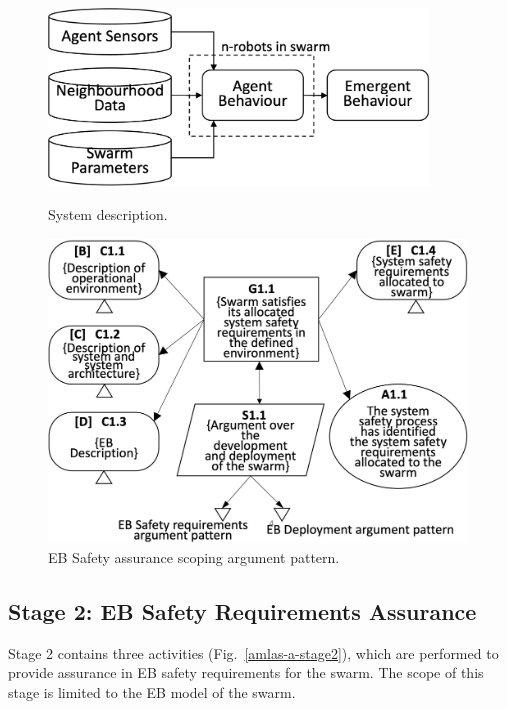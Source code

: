 \documentclass[runningheads]{llncs}
\begin{document}
\begin{figure}[!t]
	\centering
	\begin{minipage}{.5\textwidth}
		\centering
		\includegraphics[width=0.9\textwidth]{figures/stage1-systema-v2.png}
		\caption{System description.}
		\label{system-description}
	\end{minipage}%
	\begin{minipage}{.45\textwidth}
		\centering
		\includegraphics[width=0.99\textwidth]{figures/stage1-argumentpattern-v3.png}
		\vspace{-5ex}
		\caption{EB Safety assurance scoping \newline argument pattern.}
		\label{stage1-ap}
	\end{minipage}	
	\vspace{-4ex}
\end{figure}

\subsection{Stage 2: EB Safety Requirements Assurance} \label{framework-stage2}
Stage 2 contains three activities (Fig.~\ref{amlas-a-stage2}), which are performed to provide assurance in EB safety requirements for the swarm. 
The scope of this stage is limited to the EB model of the swarm.
\end{document}
